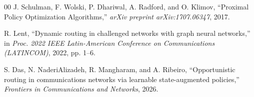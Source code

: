 \documentclass[conference]{IEEEtran}
\begin{document}
\begin{thebibliography}{00}
J. Schulman, F. Wolski, P. Dhariwal, A. Radford, and O. Klimov,
``Proximal Policy Optimization Algorithms,''
\textit{arXiv preprint arXiv:1707.06347}, 2017.

R. Lent, ``Dynamic routing in challenged networks with graph
neural networks,'' in \textit{Proc. 2022 IEEE Latin-American
Conference on Communications (LATINCOM)}, 2022, pp. 1--6.

S. Das, N. NaderiAlizadeh, R. Mangharam, and A. Ribeiro,
``Opportunistic routing in communications networks via
learnable state-augmented policies,''
\textit{Frontiers in Communications and Networks}, 2026.

\end{thebibliography}
\end{document}
